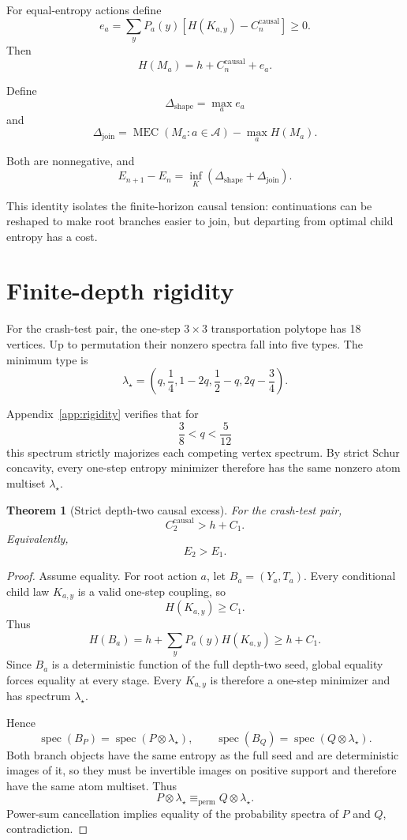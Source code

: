 \documentclass[11pt,a4paper]{article}
\newtheorem{theorem}{Theorem}[section]
\newcommand{\MEC}{\operatorname{MEC}}
\newcommand{\spec}{\operatorname{spec}}
\newcommand{\Ccausal}{C^{\mathrm{causal}}}
\newcommand{\cA}{\mathcal A}
\newcommand{\1}{\mathbf 1}
\begin{document}
For equal-entropy actions define
\[
e_a
=
\sum_yP_a(y)
\left[
H(K_{a,y})-\Ccausal_n
\right]\ge0.
\tag{13.3}
\]
Then
\[
H(M_a)
=
h+\Ccausal_n+e_a.
\tag{13.4}
\]

Define
\[
\Delta_{\mathrm{shape}}
=
\max_ae_a
\tag{13.5}
\]
and
\[
\Delta_{\mathrm{join}}
=
\MEC(M_a:a\in\cA)-\max_aH(M_a).
\tag{13.6}
\]

Both are nonnegative, and
\[
\boxed{
E_{n+1}-E_n
=
\inf_K
\left(
\Delta_{\mathrm{shape}}
+
\Delta_{\mathrm{join}}
\right).
}
\tag{13.7}
\]

This identity isolates the finite-horizon causal tension:
continuations can be reshaped to make root branches easier to join, but
departing from optimal child entropy has a cost.


\section{Finite-depth rigidity}

For the crash-test pair, the one-step \(3\times3\) transportation
polytope has 18 vertices.
Up to permutation their nonzero spectra fall into five types.
The minimum type is
\[
\lambda_\star
=
\left(
q,\frac14,1-2q,\frac12-q,2q-\frac34
\right).
\tag{14.1}
\]

Appendix~\ref{app:rigidity} verifies that for
\[
\frac38<q<\frac5{12}
\tag{14.2}
\]
this spectrum strictly majorizes each competing vertex spectrum.
By strict Schur concavity, every one-step entropy minimizer therefore
has the same nonzero atom multiset \(\lambda_\star\).

\begin{theorem}[Strict depth-two causal excess]
For the crash-test pair,
\[
\boxed{
\Ccausal_2>h+C_1.
}
\tag{14.3}
\]
Equivalently,
\[
\boxed{
E_2>E_1.
}
\tag{14.4}
\]
\end{theorem}

\begin{proof}
Assume equality.
For root action \(a\), let \(B_a=(Y_a,T_a)\).
Every conditional child law \(K_{a,y}\) is a valid one-step coupling,
so
\[
H(K_{a,y})\ge C_1.
\]
Thus
\[
H(B_a)
=
h+\sum_yP_a(y)H(K_{a,y})
\ge
h+C_1.
\]
Since \(B_a\) is a deterministic function of the full depth-two seed,
global equality forces equality at every stage.
Every \(K_{a,y}\) is therefore a one-step minimizer and has spectrum
\(\lambda_\star\).

Hence
\[
\spec(B_P)
=
\spec(P\otimes\lambda_\star),
\qquad
\spec(B_Q)
=
\spec(Q\otimes\lambda_\star).
\]
Both branch objects have the same entropy as the full seed and are
deterministic images of it, so they must be invertible images on
positive support and therefore have the same atom multiset.
Thus
\[
P\otimes\lambda_\star
\equiv_{\mathrm{perm}}
Q\otimes\lambda_\star.
\]
Power-sum cancellation implies equality of the probability spectra of
\(P\) and \(Q\), contradiction.
\end{proof}
\end{document}
